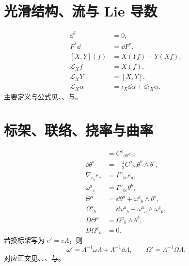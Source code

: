 \section{光滑结构、流与 Lie 导数}
\begin{align*}
\dd^2&=0,\\
F^*\dd&=\dd F^*,\\
[X,Y](f)&=X(Yf)-Y(Xf),\\
\mathcal L_Xf&=X(f),\\
\mathcal L_XY&=[X,Y],\\
\mathcal L_X\alpha&=\iota_{X}\dd\alpha+\dd\iota_{X}\alpha.
\end{align*}
主要定义与公式见、、与。

\section{标架、联络、挠率与曲率}
\begin{align*}
[e_a,e_b]&=C^c{}_{ab}e_c,\\
\dd\theta^a&=-\frac12C^a{}_{bc}\theta^b\wedge\theta^c,\\
\nabla_{e_b}e_c&=\Gamma^a{}_{bc}e_a,\\
\omega^a{}_c&=\Gamma^a{}_{bc}\theta^b,\\
\Theta^a&=\dd\theta^a+\omega^a{}_b\wedge\theta^b,\\
\Omega^a{}_b&=\dd\omega^a{}_b+\omega^a{}_c\wedge\omega^c{}_b,\\
D\Theta^a&=\Omega^a{}_b\wedge\theta^b,\\
D\Omega^a{}_b&=0.
\end{align*}
若换标架写为 \(e' = e\Lambda\)，则
\[
\omega'=\Lambda^{-1}\omega\Lambda+\Lambda^{-1}\dd\Lambda,
\qquad
\Omega'=\Lambda^{-1}\Omega\Lambda.
\]
对应正文见、、、与。

